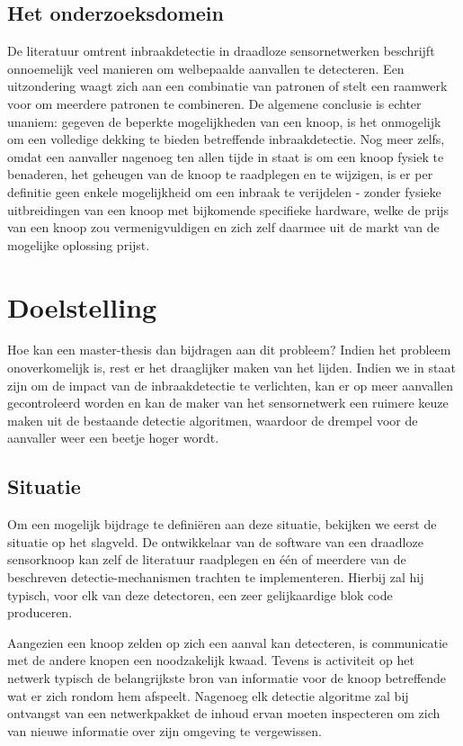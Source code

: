 \documentclass[12pt,a4paper]{article}
\begin{document}
\subsection*{Het onderzoeksdomein}

De literatuur omtrent inbraakdetectie in draadloze sensornetwerken beschrijft
onnoemelijk veel manieren om welbepaalde aanvallen te detecteren. Een
uitzondering waagt zich aan een combinatie van patronen of stelt een raamwerk
voor om meerdere patronen te combineren. De algemene conclusie is echter
unaniem: gegeven de beperkte mogelijkheden van een knoop, is het onmogelijk om
een volledige dekking te bieden betreffende inbraakdetectie. Nog meer zelfs,
omdat een aanvaller nagenoeg ten allen tijde in staat is om een knoop fysiek te
benaderen, het geheugen van de knoop te raadplegen en te wijzigen, is er per
definitie geen enkele mogelijkheid om een inbraak te verijdelen - zonder
fysieke uitbreidingen van een knoop met bijkomende specifieke hardware, welke
de prijs van een knoop zou vermenigvuldigen en zich zelf daarmee uit de markt
van de mogelijke oplossing prijst.

\section*{Doelstelling}

Hoe kan een master-thesis dan bijdragen aan dit probleem? Indien het probleem
onoverkomelijk is, rest er het draaglijker maken van het lijden. Indien we in
staat zijn om de impact van de inbraakdetectie te verlichten, kan er op meer
aanvallen gecontroleerd worden en kan de maker van het sensornetwerk een
ruimere keuze maken uit de bestaande detectie algoritmen, waardoor de drempel
voor de aanvaller weer een beetje hoger wordt.

\subsection*{Situatie}

Om een mogelijk bijdrage te defini\"eren aan deze situatie, bekijken we eerst
de situatie op het slagveld. De ontwikkelaar van de software van een draadloze
sensorknoop kan zelf de literatuur raadplegen en \'e\'en of meerdere van de
beschreven detectie-mechanismen trachten te implementeren. Hierbij zal hij
typisch, voor elk van deze detectoren, een zeer gelijkaardige blok code
produceren.

Aangezien een knoop zelden op zich een aanval kan detecteren, is communicatie
met de andere knopen een noodzakelijk kwaad. Tevens is activiteit op het
netwerk typisch de belangrijkste bron van informatie voor de knoop betreffende
wat er zich rondom hem afspeelt. Nagenoeg elk detectie algoritme zal bij
ontvangst van een netwerkpakket de inhoud ervan moeten inspecteren om zich van
nieuwe informatie over zijn omgeving te vergewissen.
\end{document}
